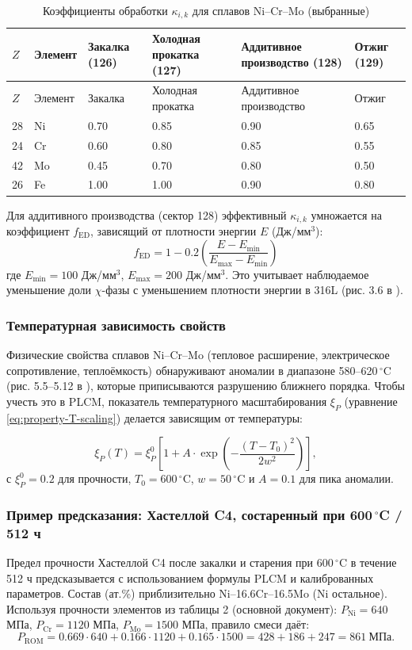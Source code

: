 \documentclass[12pt,a4paper]{article}
\begin{document}
	\begin{longtable}{p{1.5cm} p{1.2cm} p{1.8cm} p{1.8cm} p{1.8cm} p{1.8cm}}
		\caption{Коэффициенты обработки $\kappa_{i,k}$ для сплавов Ni–Cr–Mo (выбранные)}\label{tab:nicrmo_kappa_ik}\\
		\toprule
		\(Z\) & Элемент & Закалка (126) & Холодная прокатка (127) & Аддитивное производство (128) & Отжиг (129) \\
		\midrule
		\endfirsthead
		\toprule
		\(Z\) & Элемент & Закалка & Холодная прокатка & Аддитивное производство & Отжиг \\
		\midrule
		\endhead
		28 & Ni & 0.70 & 0.85 & 0.90 & 0.65 \\
		24 & Cr & 0.60 & 0.80 & 0.85 & 0.55 \\
		42 & Mo & 0.45 & 0.70 & 0.80 & 0.50 \\
		26 & Fe & 1.00 & 1.00 & 0.90 & 0.80 \\
		\bottomrule
	\end{longtable}
	
	Для аддитивного производства (сектор 128) эффективный $\kappa_{i,k}$ умножается на коэффициент $f_{\text{ED}}$, зависящий от плотности энергии $E$ (Дж/мм\(^3\)):
	\[
	f_{\text{ED}} = 1 - 0.2\left(\frac{E - E_{\text{min}}}{E_{\text{max}} - E_{\text{min}}}\right)
	\]
	где $E_{\text{min}}=100$ Дж/мм\(^3\), $E_{\text{max}}=200$ Дж/мм\(^3\). Это учитывает наблюдаемое уменьшение доли $\chi$-фазы с уменьшением плотности энергии в 316L (рис. 3.6 в \cite{dis2025}).
	
	\subsubsection{Температурная зависимость свойств}
	Физические свойства сплавов Ni–Cr–Mo (тепловое расширение, электрическое сопротивление, теплоёмкость) обнаруживают аномалии в диапазоне 580–620\,\(^{\circ}\)C (рис. 5.5–5.12 в \cite{dis2025}), которые приписываются разрушению ближнего порядка. Чтобы учесть это в PLCM, показатель температурного масштабирования $\xi_P$ (уравнение \ref{eq:property-T-scaling}) делается зависящим от температуры:
	
	\[
	\xi_P(T) = \xi_P^0 \left[1 + A \cdot \exp\left(-\frac{(T-T_0)^2}{2w^2}\right)\right],
	\]
	с $\xi_P^0 = 0.2$ для прочности, $T_0 = 600$\,\(^{\circ}\)C, $w = 50$\,\(^{\circ}\)C и $A = 0.1$ для пика аномалии.
	
	\subsubsection{Пример предсказания: Хастеллой C4, состаренный при 600\,\(^{\circ}\)C / 512 ч}
	Предел прочности Хастеллой C4 после закалки и старения при 600\,\(^{\circ}\)C в течение 512 ч предсказывается с использованием формулы PLCM и калиброванных параметров. Состав (ат.\%) приблизительно Ni–16.6Cr–16.5Mo (Ni остальное). Используя прочности элементов из таблицы 2 (основной документ): $P_{\text{Ni}}=640$ МПа, $P_{\text{Cr}}=1120$ МПа, $P_{\text{Mo}}=1500$ МПа, правило смеси даёт:
	\[
	P_{\text{ROM}} = 0.669\cdot640 + 0.166\cdot1120 + 0.165\cdot1500 = 428 + 186 + 247 = 861\ \text{МПа}.
	\]
	
\end{document}
